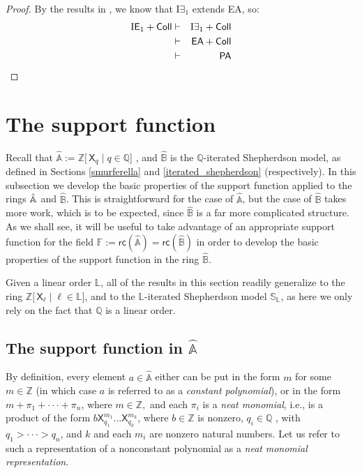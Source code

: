 \documentclass{amsart}
\newcommand{\qedright}{\belowdisplayskip=-12pt}
\begin{document}
 \begin{proof}
 By the results in \cite{kaye:diop90}, we know that $\mathrm I \mathsf \exists_1$
 extends {\sf EA}, so:\qedright
 \begin{eqnarray*}
 \mathrm I \mathsf E_1 +  {\sf Coll} & \vdash & \mathrm I\exists_1 + {\sf Coll} \\
 & \vdash & {\sf EA} + {\sf Coll} \\
 & \vdash &  {\sf PA}
 \end{eqnarray*}
 \end{proof}

 \section{The support function}\label{Section_on_supports}

Recall that $\hat{\mathbb{A}}:=\mathbb{Z}[\,\mathsf{X}_{q}\mathop\mid q\in \mathbb{Q]}$%
, and $\hat{\mathbb{B}}$ is the $\mathbb{Q}$-iterated Shepherdson model, as
defined in Sections \ref{smurferella} and \ref{iterated_shepherdson} (respectively). In this subsection we develop the basic properties of the support function applied to the rings $\hat{%
\mathbb{A}}$ and $\hat{\mathbb{B}}$. This is straightforward for the case of 
$\hat{\mathbb{A}}$, but the case of $\hat{\mathbb{B}}$ takes more work,
which is to be expected, since $\hat{\mathbb{B}}$ is a far more complicated
structure. As we shall see, it will be useful to take advantage of an appropriate support
function for the field $\mathbb{F}:=\mathsf{rc}(\hat{\mathbb{A}})=%
\mathsf{rc}(\hat{\mathbb{B}})$ in order to develop the basic properties of
the support function in the ring $\hat{\mathbb{B}}.$

Given a linear order $\mathbb{L}$, all of the results in this section
readily generalize to the ring $\mathbb{Z}[\,\mathsf{X}_{\ell}\mathop\mid\ell\in \mathbb{L]%
}$, and to the $\mathbb{L}$-iterated Shepherdson model $\mathbb{S}_{\mathbb{L}}$, 
as here we only rely on the fact that $\mathbb{Q}$ is a linear order.

\subsection{The support function in $\hat{\mathbb{A}}$}
By definition, every element $a\in \hat{\mathbb{A}}$ either can be put in the form $m$
for some $m\in \mathbb{Z}$ (in which case $a$ is referred to as a \textit{%
constant polynomial}), or in the form $m+\pi _{1}+\cdot \cdot \cdot +\pi _{n}
$, where $m\in \mathbb{Z},$ and each $\pi _{i}$ is a \textit{neat monomial},
i.e., is a product of the form $b\mathsf{X}_{q_{1}}^{m_{1}}...\mathsf{X}%
_{q_{k}}^{m_{k}}$, where $b\in \mathbb{Z}$ is nonzero, $q_{i}\in \mathbb{Q}$%
, with $q_{1}>\cdot \cdot \cdot >q_{n}$, and $k$ and each $m_{i}$ are nonzero natural numbers.
Let us refer to such a representation of a nonconstant polynomial as a \textit{neat%
} \textit{monomial representation}.
\end{document}
